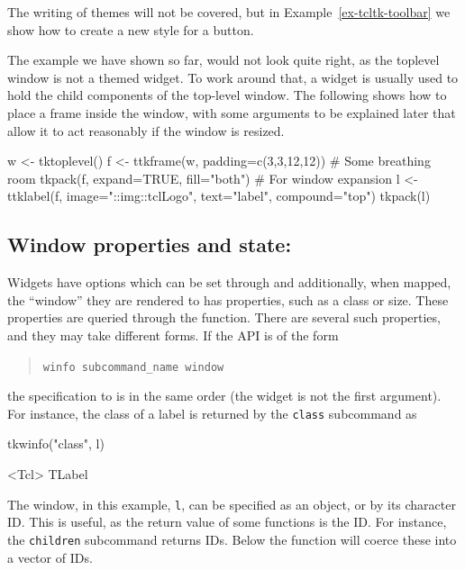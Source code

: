 The writing of themes will not be covered, but in
Example~\ref{ex-tcltk-toolbar} we show how to create a new style for a
button.

The example we have shown so far, would not look quite right, as the
toplevel window is not a themed widget. To work around that, a
 widget is usually used to hold the child
components of the top-level window. The following shows how to place a
frame inside the window, with some arguments to be explained later
that allow it to act reasonably if the window is resized.

\begin{Schunk}
\begin{Sinput}
 w <- tktoplevel()
 f <- ttkframe(w, padding=c(3,3,12,12))  # Some breathing room
 tkpack(f, expand=TRUE, fill="both")     # For window expansion
 l <- ttklabel(f, image="::img::tclLogo", text="label", 
               compound="top")
 tkpack(l)
\end{Sinput}
\end{Schunk}

\subsection{Window properties and state: }
\label{sec:tcltk:overview:widget-properties}

Widgets have options which can be set through  and
additionally, when mapped, the ``window'' they are rendered to has
properties, such as a class or size. These properties are queried
through the  function.  There are several such
properties, and they may take different forms. If the API is of the form

\begin{quotation}
\texttt{winfo subcommand\_name window}  
\end{quotation}
the specification to  is in the same order (the
widget is not the first argument). For instance, the class of a label
is returned by the \texttt{class} subcommand as

\begin{Schunk}
\begin{Sinput}
 tkwinfo("class", l)
\end{Sinput}
\begin{Soutput}
<Tcl> TLabel 
\end{Soutput}
\end{Schunk}

The window, in this example, \texttt{l}, can be specified as an \R\/
object, or by its character ID. This is useful, as the return value of
some functions is the ID. For instance, the \texttt{children}
subcommand returns IDs. Below the  function will
coerce these into a vector of IDs.

